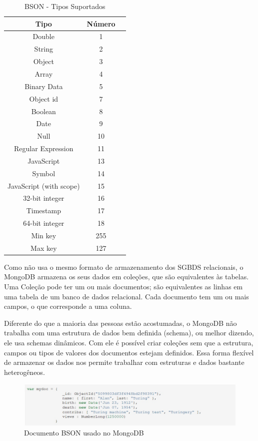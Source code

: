 \begin{table}
	\caption{BSON - Tipos Suportados}
	\begin{center}
	\begin{tabular}{ccc}
		\hline
			\textbf{Tipo} & \textbf{Número} \\
		\hline
			Double & 1 \\
			String & 2 \\
			Object & 3 \\
			Array & 4 \\
			Binary Data & 5 \\
			Object id & 7 \\
			Boolean & 8 \\
			Date & 9 \\
			Null & 10 \\
			Regular Expression & 11 \\
			JavaScript & 13 \\
			Symbol & 14 \\
			JavaScript (with scope) & 15 \\
			32-bit integer & 16 \\
			Timestamp& 17 \\
			64-bit integer & 18 \\
			Min key & 255 \\
			Max key & 127 \\
		\hline
	\end {tabular}
	\end{center}
	\label{tab:bsontypes}
\end{table}

Como não usa o mesmo formato de armazenamento dos SGBDS relacionais, o MongoDB armazena os seus dados em coleções, que são equivalentes às tabelas.  Uma Coleção pode ter um ou mais documentos; são equivalentes as linhas em uma tabela de um banco de dados relacional. Cada documento tem um ou mais campos, o que corresponde a uma coluna.

Diferente do que a maioria das pessoas estão acostumadas, o MongoDB não trabalha com uma estrutura de dados bem definida (schema), ou melhor dizendo, ele usa schemas dinâmicos. Com ele é possível criar coleções sem que a estrutura, campos ou tipos de valores dos documentos estejam definidos. Essa forma flexível de armazenar os dados nos permite trabalhar com estruturas e dados bastante heterogêneos.

	\begin{figure}[!htbp]
		\begin{center}
			\includegraphics[width=1.2\textwidth]{exbson}
		\end{center}
		\caption{Documento BSON usado no MongoDB ~\cite{sitemongodb}}
		\label{fig:exbson}
	\end{figure}


